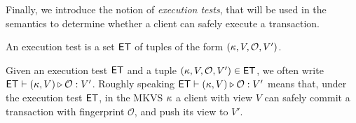 Finally, we introduce the notion of \emph{execution tests}, that will be used 
in the semantics to determine whether a client can safely execute a transaction. 
\begin{definition}
\label{def:executiontests}
An execution test is a set $\mathsf{ET}$ of tuples of the form
$(\kappa, V, \mathcal{O}, V')$.
\end{definition}
Given an execution test $\mathsf{ET}$ and a tuple $(\kappa, V, \mathcal{O}, V') \in \mathsf{ET}$, 
we often write $\mathsf{ET} \vdash (\kappa, V) \triangleright \mathcal{O} : V'$. 
Roughly speaking $\mathsf{ET} \vdash (\kappa, V) \triangleright \mathcal{O}: V'$ means 
that, under the execution test $\mathsf{ET}$, in the MKVS $\kappa$ a client with view 
$V$ can safely commit a transaction with fingerprint $\mathcal{O}$, and 
push its view to $V'$.

